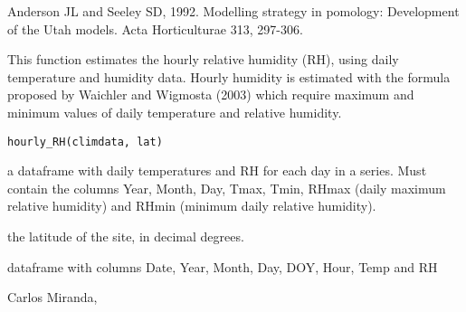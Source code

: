\documentclass[a4paper]{book}
\begin{document}
%
\begin{References}\relax
Anderson JL and Seeley SD, 1992. Modelling strategy in pomology:
Development of the Utah models. Acta Horticulturae 313, 297-306.
\end{References}
%
\begin{Examples}
\end{Examples}
%
\begin{Description}\relax
This function estimates the hourly relative humidity (RH),
using daily temperature and humidity data. Hourly humidity is
estimated with the formula proposed by Waichler and Wigmosta (2003)
which require maximum and minimum values of daily temperature
and relative humidity.
\end{Description}
%
\begin{Usage}
\begin{verbatim}
hourly_RH(climdata, lat)
\end{verbatim}
\end{Usage}
%
\begin{Arguments}
\begin{ldescription}
\item[\code{climdata}] a dataframe with daily temperatures and RH for
each day in a series. Must contain the columns Year, Month, Day,
Tmax, Tmin, RHmax (daily maximum relative humidity) and RHmin
(minimum daily relative humidity).

\item[\code{lat}] the latitude of the site, in decimal degrees.
\end{ldescription}
\end{Arguments}
%
\begin{Value}
dataframe with columns Date, Year, Month, Day, DOY,
Hour, Temp and RH
\end{Value}
%
\begin{Author}\relax
Carlos Miranda, 
\end{Author}
\end{document}
